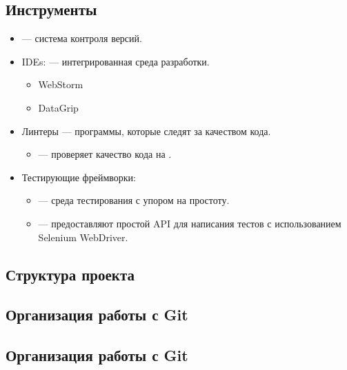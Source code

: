 \subsection{Инструменты}
\begin{itemize}
    \item \textcite{git} --- система контроля версий.
    \item IDEs: --- интегрированная среда разработки.
    \begin{itemize}
        \item WebStorm
        \item DataGrip
    \end{itemize}
    \item Линтеры --- программы, которые следят за качеством кода.
    \begin{itemize}
        \item \textcite{eslint} --- проверяет качество кода на \textcite{wiki:js}.
    \end{itemize}
    \item Тестирующие фреймворки:
    \begin{itemize}
        \item \textcite{jest} --- среда тестирования \textcite{wiki:js} с упором на простоту.
        \item \textcite{selenium-python} --- предоставляют простой API для написания тестов с использованием Selenium WebDriver.
    \end{itemize}
\end{itemize}

\subsection{Структура проекта}


\subsection{Организация работы с Git}


\subsection{Организация работы с Git}

\clearpage
